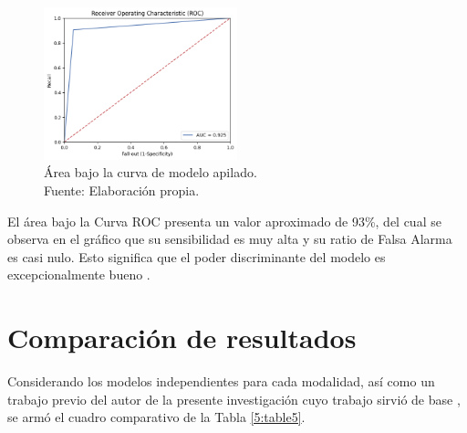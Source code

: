 \begin{figure}[!ht]
	\begin{center}
		\includegraphics[width=0.50\textwidth]{5/figures/stacked_auc.png}
		\caption[Área bajo la curva de modelo apilado]{Área bajo la curva de modelo apilado.\\
		Fuente: Elaboración propia.}
		\label{5:fig12}
	\end{center}
\end{figure}

El área bajo la Curva ROC presenta un valor aproximado de 93\%, del cual se observa en el gráfico que su sensibilidad es muy alta y su ratio de Falsa Alarma es casi nulo. Esto significa que el poder discriminante del modelo es excepcionalmente bueno \parencite{bk_britos2006datamining}.

\section{Comparación de resultados}
Considerando los modelos independientes para cada modalidad, así como un trabajo previo del autor de la presente investigación cuyo trabajo sirvió de base \parencite{pr_puente2019kickstarter_prediction}, se armó el cuadro comparativo de la Tabla \ref{5:table5}.

